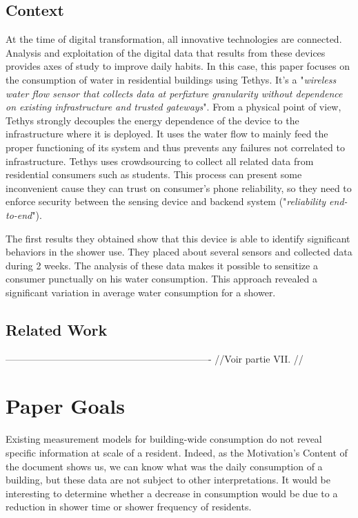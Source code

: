 \documentclass[10pt,journal,compsoc]{IEEEtran}
\begin{document}
\subsection{Context}
At the time of digital transformation, all innovative technologies are connected. Analysis and exploitation of the digital data that results from these devices provides axes of study to improve daily habits. In this case, this paper focuses on the consumption of water in residential buildings using Tethys. It's a "\emph{wireless water flow sensor that collects data at perfixture granularity without dependence on existing infrastructure and trusted gateways}"\cite{IEEEhowto:}. From a physical point of view, Tethys strongly decouples the energy dependence of the device to the infrastructure where it is deployed. It uses the water flow to mainly feed the proper functioning of its system and thus prevents any failures not correlated to infrastructure. Tethys uses crowdsourcing to collect all related data from residential consumers such as students. This process can present some inconvenient cause they can trust on consumer's phone reliability, so they need to enforce security between the sensing device and backend system ("\emph{reliability end-to-end}").

The first results they obtained show that this device is able to identify significant behaviors in the shower use. They placed about several sensors and collected data during 2 weeks. The analysis of these data makes it possible to sensitize a consumer punctually on his water consumption. This approach revealed a significant variation in average water consumption for a shower.

\subsection{Related Work}
---------------------------------------------------------------- 
//Voir partie VII. //
\section{Paper Goals}\label{sec:paperGoals}

Existing measurement models for building-wide consumption do not reveal specific information at scale of a resident. Indeed, as the Motivation's Content of the document shows us, we can know what was the daily consumption of a building, but these data are not subject to other interpretations. It would be interesting to determine whether a decrease in consumption would be due to a reduction in shower time or shower frequency of residents. 
\end{document}
